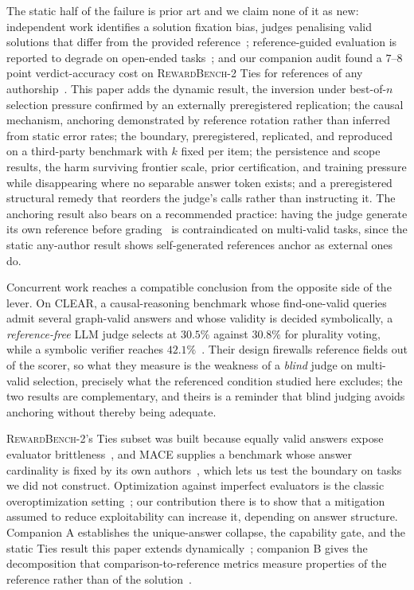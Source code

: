 \documentclass[11pt]{article}
\begin{document}
The static half of the failure is prior art and we claim none of it as new: independent work identifies a solution fixation bias, judges penalising valid solutions that differ from the provided reference~\cite{fixation2025}; reference-guided evaluation is reported to degrade on open-ended tasks~\cite{judgingref2026}; and our companion audit found a $7$--$8$ point verdict-accuracy cost on \textsc{RewardBench-2} Ties for references of any authorship~\cite{companionA}.
This paper adds the dynamic result, the inversion under best-of-$n$ selection pressure confirmed by an externally preregistered replication; the causal mechanism, anchoring demonstrated by reference rotation rather than inferred from static error rates; the boundary, preregistered, replicated, and reproduced on a third-party benchmark with $k$ fixed per item; the persistence and scope results, the harm surviving frontier scale, prior certification, and training pressure while disappearing where no separable answer token exists; and a preregistered structural remedy that reorders the judge's calls rather than instructing it.
The anchoring result also bears on a recommended practice: having the judge generate its own reference before grading~\cite{dobefore2025} is contraindicated on multi-valid tasks, since the static any-author result shows self-generated references anchor as external ones do.

Concurrent work reaches a compatible conclusion from the opposite side of the lever.
On \textsc{CLEAR}, a causal-reasoning benchmark whose find-one-valid queries admit several graph-valid answers and whose validity is decided symbolically, a \emph{reference-free} LLM judge selects at $30.5\%$ against $30.8\%$ for plurality voting, while a symbolic verifier reaches $42.1\%$~\cite{calver2026}.
Their design firewalls reference fields out of the scorer, so what they measure is the weakness of a \emph{blind} judge on multi-valid selection, precisely what the referenced condition studied here excludes; the two results are complementary, and theirs is a reminder that blind judging avoids anchoring without thereby being adequate.

\textsc{RewardBench-2}'s Ties subset was built because equally valid answers expose evaluator brittleness~\cite{malik2025rewardbench2}, and \textsc{MACE} supplies a benchmark whose answer cardinality is fixed by its own authors~\cite{mace2026}, which lets us test the boundary on tasks we did not construct.
Optimization against imperfect evaluators is the classic overoptimization setting~\cite{gao2022scaling}; our contribution there is to show that a mitigation assumed to reduce exploitability can increase it, depending on answer structure.
Companion A establishes the unique-answer collapse, the capability gate, and the static Ties result this paper extends dynamically~\cite{companionA}; companion B gives the decomposition that comparison-to-reference metrics measure properties of the reference rather than of the solution~\cite{companionB}.
\end{document}
